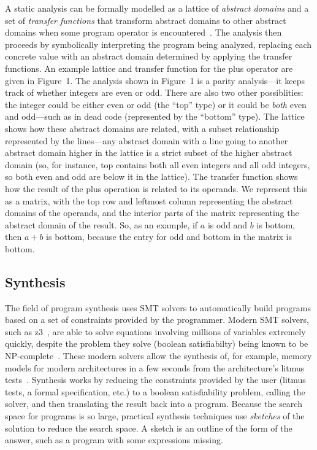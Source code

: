 \documentclass[10pt,conference]{IEEEtran}
\begin{document}
A static analysis can be formally modelled
as a lattice of \textit{abstract domains} and a set of \textit{transfer functions}
that transform abstract domains to other abstract domains when some
program operator is encountered~\cite{cousot77}. The analysis then proceeds by symbolically
interpreting the program being analyzed, replacing each concrete value with
an abstract domain determined by applying the transfer functions. An example
lattice and transfer function for the plus operator are given in Figure~1.
The analysis shown in Figure~1 is a parity analysis---it keeps track of
whether integers are even or odd. There are also two other possiblities:
the integer could be either even or odd (the ``top'' type) or it could
be \textit{both} even and odd---such as in dead code (represented by the
``bottom'' type). The lattice shows how these abstract domains are related,
with a subset relationship represented by the lines---any abstract domain
with a line going to another abstract domain higher in the lattice is a strict
subset of the higher abstract domain (so, for instance, top contains both
all even integers and all odd integers, so both even and odd are below it in the lattice).
The transfer function shows how the result of the plus operation is related
to its operands. We represent this as a matrix, with the top row and leftmost
column representing the abstract domains of the operands, and the interior
parts of the matrix representing the abstract domain of the result. So,
as an example, if $a$ is odd and $b$ is bottom, then $a + b$ is bottom,
because the entry for odd and bottom in the matrix is bottom.

\subsection{Synthesis}

The field of program synthesis uses SMT solvers to
automatically build programs based on a set of constraints provided
by the programmer. Modern SMT solvers, such as z3~\cite{z3}, are able
to solve equations involving millions of variables extremely quickly, despite 
the problem they solve (boolean satisfiabilty) being known to be NP-complete~\cite{cook71complexity}. 
These modern solvers allow the synthesis of, for example, memory models for modern architectures
in a few seconds from the architecture's litmus tests~\cite{bornholt17}.
Synthesis works by reducing the constraints provided by the user
(litmus tests, a formal specification, etc.) to a boolean satisfiability
problem, calling the solver, and then translating the result back into
a program. Because the search space for programs is so large, practical
synthesis techniques use \textit{sketches} of the solution to reduce
the search space. A sketch is an outline of the form of the answer,
such as a program with some expressions missing.
\end{document}
